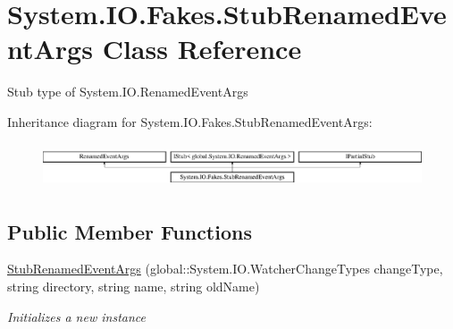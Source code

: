 \hypertarget{class_system_1_1_i_o_1_1_fakes_1_1_stub_renamed_event_args}{\section{System.\-I\-O.\-Fakes.\-Stub\-Renamed\-Event\-Args Class Reference}
\label{class_system_1_1_i_o_1_1_fakes_1_1_stub_renamed_event_args}
}


Stub type of System.\-I\-O.\-Renamed\-Event\-Args 


Inheritance diagram for System.\-I\-O.\-Fakes.\-Stub\-Renamed\-Event\-Args\-:\begin{figure}[H]
\begin{center}
\leavevmode
\includegraphics[height=1.323877cm]{class_system_1_1_i_o_1_1_fakes_1_1_stub_renamed_event_args}
\end{center}
\end{figure}
\subsection*{Public Member Functions}
\begin{DoxyCompactItemize}
\item 
\hyperlink{class_system_1_1_i_o_1_1_fakes_1_1_stub_renamed_event_args_ac2d3230b89fb4019273f6c44da7c1b9a}{Stub\-Renamed\-Event\-Args} (global\-::\-System.\-I\-O.\-Watcher\-Change\-Types change\-Type, string directory, string name, string old\-Name)
\begin{DoxyCompactList}\small\item\em Initializes a new instance\end{DoxyCompactList}\end{DoxyCompactItemize}
